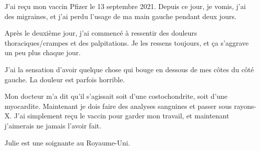 J'ai reçu mon vaccin Pfizer le 13 septembre 2021. Depuis ce jour, je vomis, j'ai
des migraines, et j'ai perdu l'usage de ma main gauche pendant deux jours.

Après le deuxième jour, j'ai commencé à ressentir des douleurs
thoraciques/crampes et des palpitations. Je les ressens toujours, et ça
s'aggrave un peu plus chaque jour.

J'ai la sensation d'avoir quelque chose qui bouge en dessous de mes côtes du
côté gauche. La douleur est parfois horrible.

Mon docteur m'a dit qu'il s'agissait soit d'une costochondrite, soit d'une
myocardite. Maintenant je dois faire des analyses sanguines et passer sous
rayons-X. J'ai simplement reçu le vaccin pour garder mon travail, et maintenant
j'aimerais ne jamais l'avoir fait.

Julie est une soignante au Royaume-Uni.

